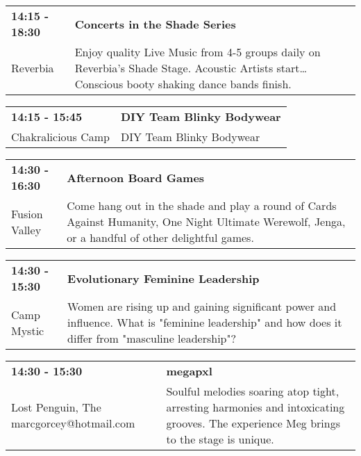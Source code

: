 \begin{tabular}{ p{1in} p{2.2in} }
    \textbf{14:15 - 18:30} & \textbf{Concerts in the Shade Series} \\
    Reverbia \newline  & Enjoy quality Live Music from 4-5 groups daily on Reverbia's Shade Stage.  Acoustic Artists start\ldots Conscious booty shaking dance bands finish. \\
    \hline 
\end{tabular}
    
\begin{tabular}{ p{1in} p{2.2in} }
    \textbf{14:15 - 15:45} & \textbf{DIY Team Blinky Bodywear} \\
    Chakralicious Camp \newline  & DIY Team Blinky Bodywear \\
    \hline 
\end{tabular}
    
\begin{tabular}{ p{1in} p{2.2in} }
    \textbf{14:30 - 16:30} & \textbf{Afternoon Board Games} \\
    Fusion Valley \newline  & Come hang out in the shade and play a round of Cards Against Humanity, One Night Ultimate Werewolf, Jenga, or a handful of other delightful games. \\
    \hline 
\end{tabular}
    
\begin{tabular}{ p{1in} p{2.2in} }
    \textbf{14:30 - 15:30} & \textbf{Evolutionary Feminine Leadership } \\
    Camp Mystic \newline  & Women are rising up and gaining significant power and influence. What is "feminine leadership" and how does it differ from "masculine leadership"? \\
    \hline 
\end{tabular}
    
\begin{tabular}{ p{1in} p{2.2in} }
    \textbf{14:30 - 15:30} & \textbf{megapxl} \\
    Lost Penguin, The \newline marcgorcey@hotmail.com & Soulful melodies soaring atop tight, arresting harmonies and intoxicating grooves. The experience Meg brings to the stage is unique. \\
    \hline 
\end{tabular}
    
